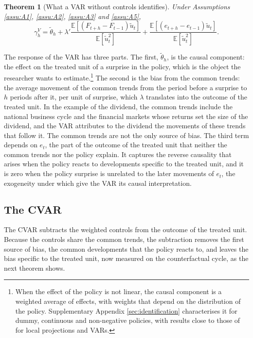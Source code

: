 \documentclass[12pt,a4paper]{article}
\newtheorem{thm}{Theorem}
\theoremstyle{definition}
\theoremstyle{definition}\newtheorem{example}{Example}
\theoremstyle{definition}\newtheorem{definition}{Definition}
\newcommand{\E}{\mathbb{E}}
\begin{document}
\begin{thm}[What a VAR without controls identifies\label{thm:var}]
Under Assumptions \ref{assu:A1}, \ref{assu:A2}, \ref{assu:A3} and \ref{assu:A5},
\begin{equation}
\gamma^{V}_h=\tilde\theta_h+\lambda'\frac{\E[(F_{t+h}-F_{t-1})\tilde u_t]}{\E[\tilde u_t^2]}+\frac{\E[(e_{t+h}-e_{t-1})\tilde u_t]}{\E[\tilde u_t^2]}.
\label{eq:bias}
\end{equation}
\end{thm}

The response of the VAR has three parts. The first, $\tilde\theta_h$, is the causal component: the effect on the treated unit of a surprise in the policy, which is the object the researcher wants to estimate.\footnote{When the effect of the policy is not linear, the causal component is a weighted average of effects, with weights that depend on the distribution of the policy. Supplementary Appendix \ref{sec:identification} characterises it for dummy, continuous and non-negative policies, with results close to those of \citet{kolesar2024dynamic} for local projections and VARs.} The second is the bias from the common trends: the average movement of the common trends from the period before a surprise to $h$ periods after it, per unit of surprise, which $\lambda$ translates into the outcome of the treated unit. In the example of the dividend, the common trends include the national business cycle and the financial markets whose returns set the size of the dividend, and the VAR attributes to the dividend the movements of these trends that follow it. The common trends are not the only source of bias. The third term depends on $e_t$, the part of the outcome of the treated unit that neither the common trends nor the policy explain. It captures the reverse causality that arises when the policy reacts to developments specific to the treated unit, and it is zero when the policy surprise is unrelated to the later movements of $e_t$, the exogeneity under which \citet{RambachanSheppard2021} give the VAR its causal interpretation.

\subsection{The CVAR\label{sec:cvar}}

The CVAR subtracts the weighted controls from the outcome of the treated unit. Because the controls share the common trends, the subtraction removes the first source of bias, the common developments that the policy reacts to, and leaves the bias specific to the treated unit, now measured on the counterfactual cycle, as the next theorem shows.
\end{document}
